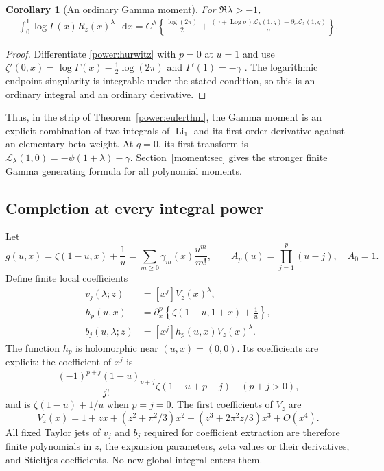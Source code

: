 \documentclass[11pt,a4paper]{article}
\numberwithin{equation}{section}
\newtheorem{corollary}[theorem]{Corollary}
\theoremstyle{definition}
\theoremstyle{remark}
\DeclareMathOperator{\Li}{Li}
\DeclareMathOperator{\Log}{Log}
\newcommand{\dd}{\mathop{}\!\mathrm{d}}
\begin{document}
\begin{corollary}[An ordinary Gamma moment]\label{power:gamma}
For $\Re\lambda>-1$,
\begin{align}\label{power:gammaformula}
 \int_0^1\log\Gamma(x)R_z(x)^\lambda\,\dd x
 =C^\lambda\left\{\frac{\log(2\pi)}2
 +\frac{(\gamma+\Log\sigma)\mathcal L_\lambda(1,q)
       -\partial_\nu\mathcal L_\lambda(1,q)}{\sigma}\right\}.
\end{align}
\end{corollary}
\begin{proof}
Differentiate \eqref{power:hurwitz} with $p=0$ at $u=1$ and use
$\zeta'(0,x)=\log\Gamma(x)-\tfrac12\log(2\pi)$ and
$\Gamma'(1)=-\gamma$ \cite{DLMF}.
The logarithmic endpoint singularity is integrable under the stated
condition, so this is an ordinary integral and an ordinary derivative.
\end{proof}

Thus, in the strip of Theorem~\ref{power:eulerthm}, the Gamma moment
is an explicit combination of two integrals of $\Li_1$ and its first
order derivative against an elementary beta weight.  At $q=0$, its
first transform is $\mathcal L_\lambda(1,0)=-\psi(1+\lambda)-\gamma$.
Section~\ref{moment:sec} gives the stronger finite Gamma generating
formula for all polynomial moments.

\subsection{Completion at every integral power}

Let
\begin{equation}\label{power:stieltjes}
 g(u,x)=\zeta(1-u,x)+\frac1u
     =\sum_{m\ge0}\gamma_m(x)\frac{u^m}{m!},\qquad
 A_p(u)=\prod_{j=1}^p(u-j),\quad A_0=1.
\end{equation}
Define finite local coefficients
\begin{align}
 v_j(\lambda;z)&=[x^j]V_z(x)^\lambda,\label{power:vj}\\
 h_p(u,x)&=\partial_x^p\left\{\zeta(1-u,1+x)+\frac1u\right\},
        \label{power:hp}\\
 b_j(u,\lambda;z)&=[x^j]h_p(u,x)V_z(x)^\lambda.
        \label{power:bj}
\end{align}
The function $h_p$ is holomorphic near $(u,x)=(0,0)$.  Its coefficients
are explicit: the coefficient of $x^j$ is
\begin{equation}\label{power:hcoeff}
 \frac{(-1)^{p+j}(1-u)_{p+j}}{j!}\zeta(1-u+p+j)
 \quad(p+j>0),
\end{equation}
and is $\zeta(1-u)+1/u$ when $p=j=0$.
The first coefficients of $V_z$ are
\[
 V_z(x)=1+zx+(z^2+\pi^2/3)x^2
                   +(z^3+2\pi^2z/3)x^3+O(x^4).
\]
All fixed Taylor jets of $v_j$ and $b_j$ required for coefficient
extraction are therefore finite polynomials in $z$, the expansion
parameters, zeta values or their derivatives, and Stieltjes
coefficients.  No new global integral enters them.
\end{document}
